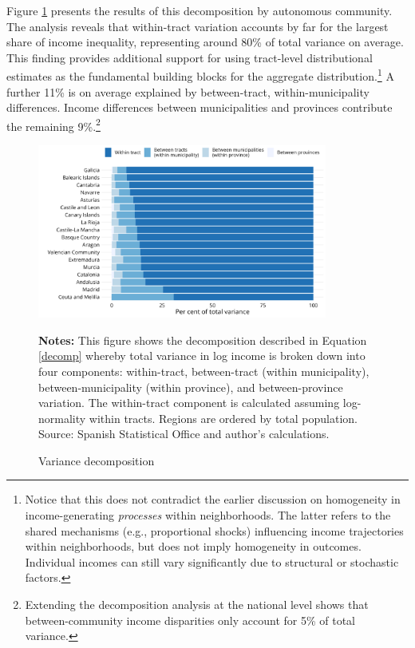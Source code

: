 Figure \ref{fig:variance_decomp} presents the results of this decomposition by autonomous community. The analysis reveals that within-tract variation accounts by far for the largest share of income inequality, representing around 80\% of total variance on average. This finding provides additional support for using tract-level distributional estimates as the fundamental building blocks for the aggregate distribution.\footnote{Notice that this does not contradict the earlier discussion on homogeneity in income-generating \textit{processes} within neighborhoods. The latter refers to the shared mechanisms (e.g., proportional shocks) influencing income trajectories within neighborhoods, but does not imply homogeneity in outcomes. Individual incomes can still vary significantly due to structural or stochastic factors.} A further 11\% is on average explained by between-tract, within-municipality differences. Income differences between municipalities and provinces contribute the remaining 9\%.\footnote{Extending the decomposition analysis at the national level shows that between-community income disparities only account for 5\% of total variance.}


\begin{figure}[H]
\begin{center}
\captionsetup{justification=centering}
\caption{Variance decomposition}
\label{fig:variance_decomp}
\includegraphics[width=0.85\textwidth]{output/variance_decomp_2023.png}
\end{center}
\begin{fignotes2}
\textbf{Notes:} This figure shows the decomposition described in Equation \ref{decomp} whereby total variance in log income is broken down into four components: within-tract, between-tract (within municipality), between-municipality (within province), and between-province variation. The within-tract component is calculated assuming log-normality within tracts. Regions are ordered by total population. Source: Spanish Statistical Office and author's calculations.
\end{fignotes2}
\end{figure}